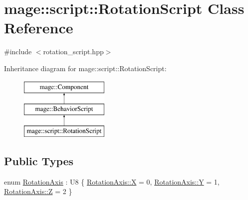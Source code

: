 \hypertarget{classmage_1_1script_1_1_rotation_script}{}\section{mage\+:\+:script\+:\+:Rotation\+Script Class Reference}
\label{classmage_1_1script_1_1_rotation_script}


{\ttfamily \#include $<$rotation\+\_\+script.\+hpp$>$}

Inheritance diagram for mage\+:\+:script\+:\+:Rotation\+Script\+:\begin{figure}[H]
\begin{center}
\leavevmode
\includegraphics[height=3.000000cm]{classmage_1_1script_1_1_rotation_script}
\end{center}
\end{figure}
\subsection*{Public Types}
\begin{DoxyCompactItemize}
\item 
enum \hyperlink{classmage_1_1script_1_1_rotation_script_a54e1d1d0af65f43f5bc5ad65a4b9c00a}{Rotation\+Axis} \+: U8 \{ \hyperlink{classmage_1_1script_1_1_rotation_script_a54e1d1d0af65f43f5bc5ad65a4b9c00aa02129bb861061d1a052c592e2dc6b383}{Rotation\+Axis\+::X} = 0, 
\hyperlink{classmage_1_1script_1_1_rotation_script_a54e1d1d0af65f43f5bc5ad65a4b9c00aa57cec4137b614c87cb4e24a3d003a3e0}{Rotation\+Axis\+::Y} = 1, 
\hyperlink{classmage_1_1script_1_1_rotation_script_a54e1d1d0af65f43f5bc5ad65a4b9c00aa21c2e59531c8710156d34a3c30ac81d5}{Rotation\+Axis\+::Z} = 2
 \}
\end{DoxyCompactItemize}
